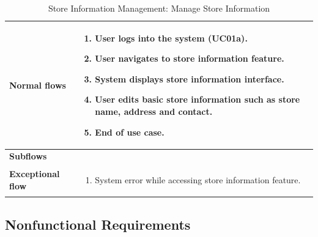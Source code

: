 \documentclass[../thesis.tex]{subfiles}
\begin{document}
\begin{center}
\begin{table}[H]
{\begin{tabular}[htbp]{|p{}|p{}|}
                \textbf{Normal flows         }   & \begin{enumerate}
                                                       \item User logs into the system (UC01a).
                                                       \item  User navigates to store information feature.
                                                       \item System displays store information interface.
                                                       \item User edits basic store information such as store name, address and contact.
                                                       \item End of use case.
                                                   \end{enumerate} \\ \hline
                \textbf{Subflows              }  &                                                                                   \\ \hline
                \textbf{Exceptional flow       } & \begin{enumerate}
                                                       \item System error while accessing store information feature.
                                                   \end{enumerate}      \\ \hline
            \end{tabular}%
        }
        \caption{Store Information Management: Manage Store Information}
        \label{tab:table-usecase-manage-store-info}
    \end{table}
\end{center}
\subsection{Nonfunctional Requirements}
\end{document}
